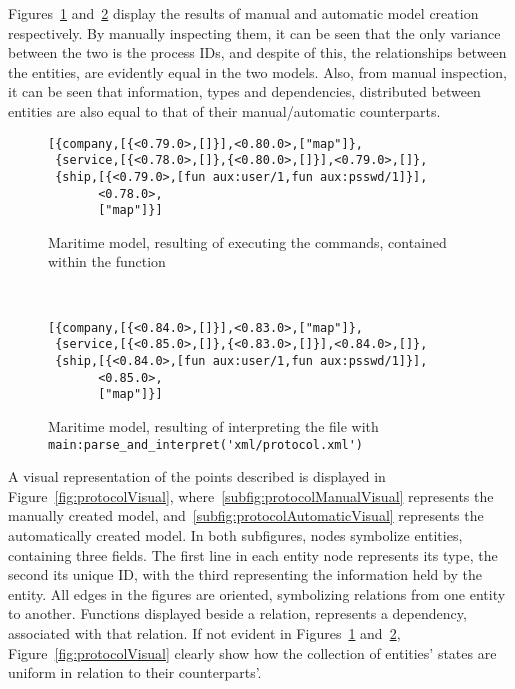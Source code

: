 Figures~\ref{fig:protocolManual} and~\ref{fig:protocolAutomatic} display the results of manual and automatic model creation respectively. By manually inspecting them, it can be seen that the only variance between the two is the process IDs, and despite of this, the relationships between the entities, are evidently equal in the two models. Also, from manual inspection, it can be seen that information, types and dependencies, distributed between entities are also equal to that of their manual/automatic counterparts.\\[0.25 cm]
\begin{figure}[h]
  \begin{lstlisting}[keywordstyle={}]
[{company,[{<0.79.0>,[]}],<0.80.0>,["map"]},
 {service,[{<0.78.0>,[]},{<0.80.0>,[]}],<0.79.0>,[]},
 {ship,[{<0.79.0>,[fun aux:user/1,fun aux:psswd/1]}],
       <0.78.0>,
       ["map"]}]
  \end{lstlisting}
  \caption{Maritime model, resulting of executing the commands, contained within the function }
  \label{fig:protocolManual}
\end{figure}
\ \\[0.25 cm]
\begin{figure}[h]
  \begin{lstlisting}[keywordstyle={}]
[{company,[{<0.84.0>,[]}],<0.83.0>,["map"]},
 {service,[{<0.85.0>,[]},{<0.83.0>,[]}],<0.84.0>,[]},
 {ship,[{<0.84.0>,[fun aux:user/1,fun aux:psswd/1]}],
       <0.85.0>,
       ["map"]}]
  \end{lstlisting}
  \caption{Maritime model, resulting of interpreting the file  with \lstinline{main:parse_and_interpret('xml/protocol.xml')}}
  \label{fig:protocolAutomatic}
\end{figure}
\newpage
\noindent
A visual representation of the points described is displayed in Figure~\ref{fig:protocolVisual}, where~\ref{subfig:protocolManualVisual} represents the manually created model, and~\ref{subfig:protocolAutomaticVisual} represents the automatically created model. In both subfigures, nodes symbolize entities, containing three fields. The first line in each entity node represents its type, the second its unique ID, with the third representing the information held by the entity. All edges in the figures are oriented, symbolizing relations from one entity to another. Functions displayed beside a relation, represents a dependency, associated with that relation. If not evident in Figures~\ref{fig:protocolManual} and~\ref{fig:protocolAutomatic}, Figure~\ref{fig:protocolVisual} clearly show how the collection of entities' states are uniform in relation to their counterparts'.

